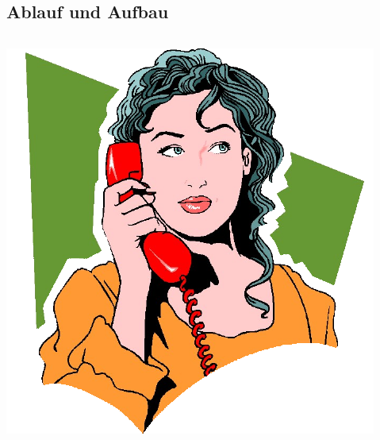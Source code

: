 \subsection{Ablauf und Aufbau}
\begin{frame}
	\begin{columns}
		\begin{column}{0.33\linewidth}
			\includegraphics[scale=0.85]{figures/ALICE.png}
		\end{column}
		\begin{column}[c]{0.34\linewidth}
			

\end{column}
\end{columns}
\end{frame}
